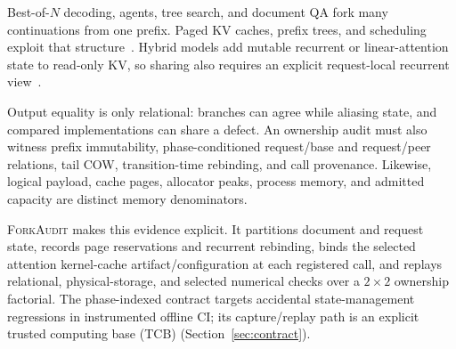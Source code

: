 \documentclass{article}
\newcommand{\method}{\textsc{ForkAudit}}
\begin{document}
Best-of-$N$ decoding, agents, tree search, and document QA fork many
continuations from one prefix.  Paged KV caches, prefix trees, and scheduling
exploit that structure~\citep{kwon2023pagedattention,zheng2024sglang,
gim2024promptcache,srivatsa2025preble}.  Hybrid models add mutable recurrent or
linear-attention state to read-only KV, so sharing also requires an explicit
request-local recurrent view~\citep{yang2025gateddeltanet,lieber2025jamba,
pan2025marconi}.

Output equality is only relational: branches can agree while aliasing state,
and compared implementations can share a defect.  An ownership audit must also
witness prefix immutability, phase-conditioned request/base and request/peer
relations, tail COW, transition-time rebinding, and call provenance.  Likewise,
logical payload, cache pages, allocator peaks, process memory, and admitted
capacity are distinct memory denominators.

\method{} makes this evidence explicit.  It partitions document and request
state, records page reservations and recurrent rebinding, binds the selected
attention kernel-cache artifact/configuration at each registered call, and replays
relational, physical-storage, and selected numerical checks over a
$2\times2$ ownership factorial.  The
phase-indexed contract targets accidental state-management regressions in
instrumented offline CI; its capture/replay path is an explicit trusted
computing base (TCB)
(Section~\ref{sec:contract}).
\end{document}
